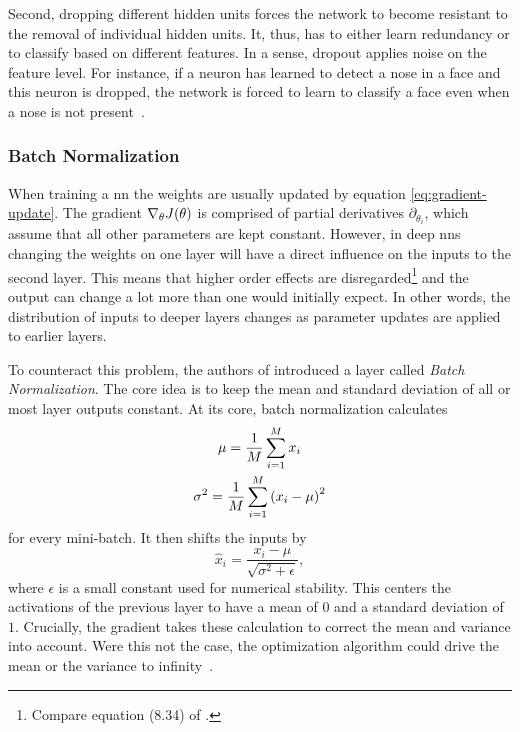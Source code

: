 Second, dropping different hidden units forces the network to become resistant to the removal of individual hidden units. It, thus, has to either learn redundancy or to classify based on different features. In a sense, dropout applies noise on the feature level. For instance, if a neuron has learned to detect a nose in a face and this neuron is dropped, the network is forced to learn to classify a face even when a nose is not present~\cite{Goodfellow:2016:DNN}.

\subsubsection{Batch Normalization}
When training a \acrshort{nn} the weights are usually updated by equation \eqref{eq:gradient-update}. The gradient $\nabla_\theta J{\left( \theta \right)}$ is comprised of partial derivatives $\partial_{\theta_i}$, which assume that all other parameters are kept constant. However, in deep \acrshort{nn}s changing the weights on one layer will have a direct influence on the inputs to the second layer. This means that higher order effects are disregarded\footnote{Compare equation (8.34) of \cite{Goodfellow:2016:DNN}.} and the output can change a lot more than one would initially expect. In other words, the distribution of inputs to deeper layers changes as parameter updates are applied to earlier layers.

To counteract this problem, the authors of \cite{Ioffe:2015aaa} introduced a layer called \emph{Batch Normalization}. The core idea is to keep the mean and standard deviation of all or most layer outputs constant. At its core, batch normalization calculates
\begin{gather}
\mu = \frac{1}{M}\sum_{i=1}^M x_i\\
\sigma^2 = \frac{1}{M}\sum_{i=1}^M{\left( x_i - \mu \right)}^2
\end{gather}
for every mini-batch. It then shifts the inputs by
\begin{equation}\label{eq:batch_norm_distribution_shift}
\hat{x}_i = \frac{x_i - \mu}{\sqrt{\sigma^2+\epsilon}},
\end{equation}
where $\epsilon$ is a small constant used for numerical stability. This centers the activations of the previous layer to have a mean of $0$ and a standard deviation of $1$. Crucially, the gradient takes these calculation to correct the mean and variance into account. Were this not the case, the optimization algorithm could drive the mean or the variance to infinity~\cite{Goodfellow:2016:DNN, Ioffe:2015aaa}. %

